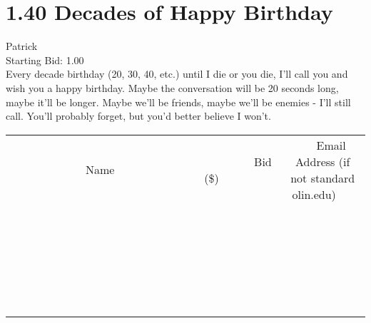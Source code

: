\documentclass[11pt]{article}
\begin{document}
					\section*{1.40 Decades of Happy Birthday}
					Patrick \\
					Starting Bid: 1.00 \\
					Every decade birthday (20, 30, 40, etc.) until I die or you die, I'll call you and wish you a happy birthday. Maybe the conversation will be 20 seconds long, maybe it'll be longer. Maybe we'll be friends, maybe we'll be enemies - I'll still call. You'll probably forget, but you'd better believe I won't. \\
					[6ex]
					\begin{tabular}{c c c}
						~~~~~~~~~~~~~Name~~~~~~~~~~~~~ & ~~~~~~~~~Bid (\$)~~~~~~~~~ & ~~~Email Address (if not standard olin.edu)~~~ \\
				
 & & \\
\hline
 & & \\
\hline
 & & \\
\hline
 & & \\
\hline
 & & \\
\hline
 & & \\
\hline
 & & \\
\hline
 & & \\
\hline
 & & \\
\hline
 & & \\
\hline
 & & \\
\hline
 & & \\
\hline
 & & \\
\hline
 & & \\
\hline
 & & \\
\hline
 & & \\
\hline
 & & \\
\hline
 & & \\
\hline
 & & \\
\hline
 & & \\
\hline
 & & \\
\hline
 & & \\
\hline
 & & \\
\hline
 & & \\
\hline
 & & \\
\hline
 & & \\
\hline
					\end{tabular}
					\clearpage
				
\end{document}
